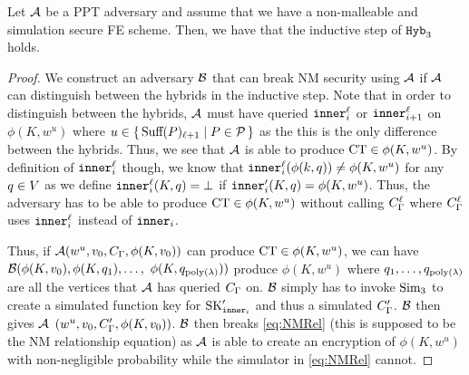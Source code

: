 \begin{lemma}
		\label{lem:NMIndep}
		Let $\mathcal{A}$ be a PPT adversary and assume that we have a non-malleable and simulation secure
		FE scheme. Then, we have that the inductive step of $\texttt{Hyb}_3$ holds.
		\begin{proof}
			We construct an adversary $\mathcal{B}$ that can break NM security using $\mathcal{A}$ if $\mathcal{A}$ can distinguish between the hybrids
			in the inductive step.
			Note that in order to distinguish between the hybrids, $\mathcal{A}$ must have queried $\texttt{inner}^\ell_i$ or $\texttt{inner}^\ell_{i + 1}$ on $\phi(K, w^u)$ where $u \in \set{\text{Suff}(P)_{\ell + 1} \mid P \in \mathcal{P}}$
			as the this is the only difference between the hybrids.
			Thus, we see that $\mathcal{A}$ is able to produce $\text{CT} \in \phi(K, w^u)$.
			By definition of $\texttt{inner}_i^\ell$ though, we know that $\texttt{inner}_i^\ell(\phi(k, q)) \neq \phi(K, w^u)$
			for any $q \in V$ as we define $\texttt{inner}_i^\ell(K, q) = \bot$ if $\texttt{inner}_i'(K, q) = \phi(K, w^u)$.
			Thus, the adversary has to be able to produce $\text{CT} \in \phi(K, w^u)$ without calling $C_\Gamma^\ell$
			where $C_\Gamma^\ell$ uses $\texttt{inner}_i^\ell$ instead of $\texttt{inner}_i$.

			Thus, if $\mathcal{A}(w^u, v_0, C_\Gamma, \phi(K, v_0))$ can produce $\text{CT} \in \phi(K, w^u)$,
			we can have $\mathcal{B}(\phi(K, v_0), \phi(K, q_1), \dots,$ $ \phi(K,q_{\operatorname{poly}(\lambda)}))$ 
			produce $\phi(K, w^u)$ where $q_1, \dots, q_{\operatorname{poly}(\lambda)}$ are all the vertices that $\mathcal{A}$ has queried $C_\Gamma$ on.
			$\mathcal{B}$ simply has to invoke $\text{Sim}_3$ to create a simulated function key for $\text{SK}_{\texttt{inner}_i}'$
			and thus a simulated $C_\Gamma'$.
			$\mathcal{B}$ then gives $\mathcal{A}$ $(w^u, v_0, C_\Gamma', \phi(K, v_0))$.
			$\mathcal{B}$ then breaks \cref{eq:NMRel} (this is supposed to be the NM relationship equation) as $\mathcal{A}$ is able to create an encryption of $\phi(K, w^u)$ with non-negligible probability while the simulator 
			in \cref{eq:NMRel} cannot.
		\end{proof}
\end{lemma}

